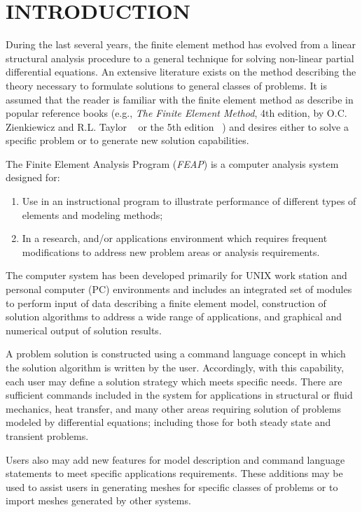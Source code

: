 \chapter[Introduction]{INTRODUCTION}
\label{intro}

During the last several years, the finite element method has evolved
from a linear structural analysis procedure to a general technique
for solving non-linear partial differential equations.  An extensive
literature exists on the method describing
the theory necessary to formulate solutions
to general classes of problems. It is
assumed that the reader is familiar with the finite element method as
describe in popular reference books (e.g., {\it The Finite Element Method},
4th edition, by O.C. Zienkiewicz and R.L. Taylor ~\cite{zt1,zt2} or
the 5th edition ~\cite{zt1n,zt2n,zt3n}) and
desires either to solve a specific problem or to
generate new solution capabilities.

The Finite Element Analysis Program
({\sl FEAP}) is a computer analysis system designed for:

\begin{enumerate}
\item Use in an instructional program to illustrate performance
of different types of elements and modeling methods; 
\item In a research, and/or applications
environment which requires frequent modifications to address new
problem areas or analysis requirements.
\end{enumerate}
The computer system has been
developed primarily for UNIX work station and personal computer (PC)
environments
and includes an integrated set of modules to perform input of data describing
a finite element model, construction of solution algorithms to address a wide
range of applications, and graphical and numerical output of solution results.

A problem solution is constructed using a command
language concept in which the solution algorithm is
written by the user.  Accordingly, with this capability, each
user may define a solution strategy which meets specific needs.
There are sufficient commands included in the system for
applications in structural or fluid mechanics, heat transfer, and
many other areas requiring solution of problems modeled by differential
equations; including those
for both steady state and transient problems.

Users also may add new features for model description and command language
statements to meet specific applications requirements. These additions 
may be used to assist users in generating meshes
for specific classes of problems or to import meshes generated by other
systems.

